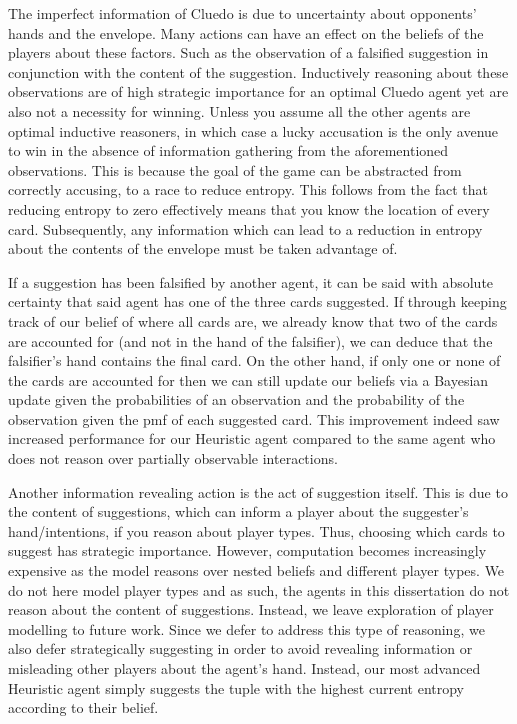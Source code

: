 \documentclass[msc, ai, logo, twoside, notimes, parskip, leftchapter, normalheadings]{infthesis}
\begin{document}
The imperfect information of Cluedo is due to uncertainty about opponents' hands and the envelope. Many actions can have an effect on the beliefs of the players about these factors. Such as the observation of a falsified suggestion in conjunction with the content of the suggestion. Inductively reasoning about these observations are of high strategic importance for an optimal Cluedo agent yet are also not a necessity for winning. Unless you assume all the other agents are optimal inductive reasoners, in which case a lucky accusation is the only avenue to win in the absence of information gathering from the aforementioned observations. This is because the goal of the game can be abstracted from correctly accusing, to a race to reduce entropy. This follows from the fact that reducing entropy to zero effectively means that you know the location of every card. Subsequently, any information which can lead to a reduction in entropy about the contents of the envelope must be taken advantage of. 

If a suggestion has been falsified by another agent, it can be said with absolute certainty that said agent has one of the three cards suggested. If through keeping track of our belief of where all cards are, we already know that two of the cards are accounted for (and not in the hand of the falsifier), we can deduce that the falsifier's hand contains the final card. On the other hand, if only one or none of the cards are accounted for then we can still update our beliefs via a Bayesian update given the probabilities of an observation and the probability of the observation given the pmf of each suggested card. This improvement indeed saw increased performance for our Heuristic agent compared to the same agent who does not reason over partially observable interactions. 

Another information revealing action is the act of suggestion itself. This is due to the content of suggestions, which can inform a player about the suggester's hand/intentions, if you reason about player types. Thus, choosing which cards to suggest has strategic importance. However, computation becomes increasingly expensive as the model reasons over nested beliefs and different player types. We do not here model player types and as such, the agents in this dissertation do not reason about the content of suggestions. Instead, we leave exploration of player modelling to future work. Since we defer to address this type of reasoning, we also defer strategically suggesting in order to avoid revealing information or misleading other players about the agent's hand. Instead, our most advanced Heuristic agent simply suggests the tuple with the highest current entropy according to their belief. 
\end{document}
